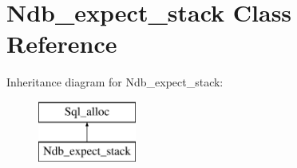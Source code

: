 \hypertarget{classNdb__expect__stack}{}\section{Ndb\+\_\+expect\+\_\+stack Class Reference}
\label{classNdb__expect__stack}
Inheritance diagram for Ndb\+\_\+expect\+\_\+stack\+:\begin{figure}[H]
\begin{center}
\leavevmode
\includegraphics[height=2.000000cm]{classNdb__expect__stack}
\end{center}
\end{figure}
